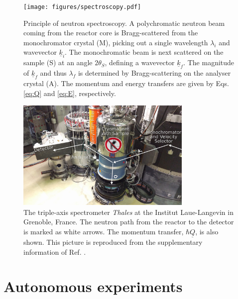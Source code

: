 \begin{figure}[htb]
	\centering
	\texttt{[image: figures/spectroscopy.pdf]}
	\caption[Neutron spectroscopy.]{
		Principle of neutron spectroscopy. A polychromatic neutron beam coming from the reactor core is Bragg-scattered
		from the monochromator crystal (M), picking out a single wavelength $\lambda_i$ and wavevector $\underline{k}_i$.
		The monochromatic beam is next scattered on the sample (S) at an angle $2\theta_S$, defining a wavevector $\underline{k}_f$.
		The magnitude of $\underline{k}_f$ and thus $\lambda_f$ is determined by Bragg-scattering on the analyser crystal (A).
		The momentum and energy transfers are given by Eqs. \ref{eq:Q} and \ref{eq:E}, respectively. }
	\label{fig:spectroscopy}
\end{figure}

\begin{figure}[htb]
	\centering
	\includegraphics[width=0.75\textwidth]{figures/thales.jpg}
	\caption[The Thales instrument at the ILL.]{
		The triple-axis spectrometer \textit{Thales} \cite{thales} at the Institut Laue-Langevin in Grenoble, France.
		The neutron path from the reactor to the detector is marked as white arrows. The momentum transfer, 
		$\hbar \underline{Q}$, is also shown.
		This picture is reproduced from the supplementary information of Ref. \cite{skxpaper}.}
	\label{fig:thales}
\end{figure}



\section{Autonomous experiments \label{sec:autonomous}}

